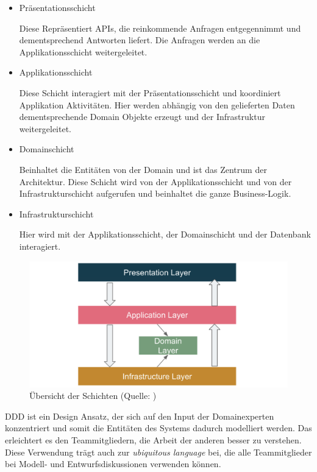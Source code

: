 \documentclass[a4paper, fontsize=11pt, parskip=half, twoside]{scrreprt}
\begin{document}
	\begin{itemize}
		\item Präsentationsschicht
		
		Diese Repräsentiert \ac{API}s, die reinkommende Anfragen entgegennimmt und dementsprechend Antworten liefert.
		Die Anfragen werden an die Applikationsschicht weitergeleitet.
		
		\item Applikationsschicht
		
		Diese Schicht interagiert mit der Präsentationsschicht und koordiniert Applikation Aktivitäten.
		Hier werden abhängig von den gelieferten Daten dementsprechende Domain Objekte erzeugt und der Infrastruktur weitergeleitet.
		
		\item Domainschicht
		
		Beinhaltet die Entitäten von der Domain und ist das Zentrum der Architektur.
		Diese Schicht wird von der Applikationsschicht und von der Infrastrukturschicht aufgerufen und beinhaltet die ganze Business-Logik.
		
		\item Infrastrukturschicht
		
		Hier wird mit der Applikationsschicht, der Domainschicht und der Datenbank interagiert.
	\end{itemize}

	\begin{figure}[H]
		\centering
		\includegraphics[scale=0.5]{assets/layeredArchitecture.png}
		\caption{Übersicht der Schichten (Quelle: \textcite{zhang_domain_nodate})}
	\end{figure}
	
	\ac{DDD} ist ein Design Ansatz, der sich auf den Input der Domainexperten konzentriert und somit die Entitäten des Systems dadurch modelliert werden.
	Das erleichtert es den Teammitgliedern, die Arbeit der anderen besser zu verstehen.
	Diese Verwendung trägt auch zur \emph{ubiquitous language} bei, die alle Teammitglieder bei Modell- und Entwurfsdiskussionen verwenden können.
	
\end{document}
